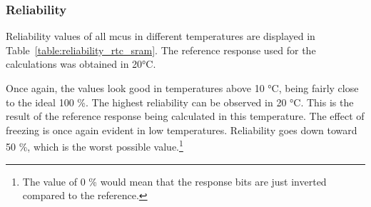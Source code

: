 \subsubsection*{Reliability}

Reliability values of all \glspl{mcu} in different temperatures are displayed in Table~\ref{table:reliability_rtc_sram}. The reference response used for the calculations was obtained in 20°C.

Once again, the values look good in temperatures above 10 °C, being fairly close to the ideal 100 \%. The highest reliability can be observed in 20 °C. This is the result of the reference response being calculated in this temperature. The effect of freezing is once again evident in low temperatures. Reliability goes down toward 50 \%, which is the worst possible value.\footnote{The value of 0 \% would mean that the response bits are just inverted compared to the reference.} 

